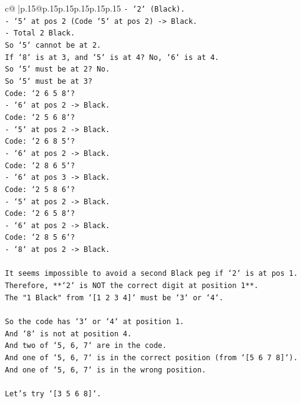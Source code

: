 \documentclass{article}
\begin{document}
{\begin{supertabular}{c@{$\;$}|p{.15\linewidth}@{}p{.15\linewidth}p{.15\linewidth}p{.15\linewidth}p{.15\linewidth}p{.15\linewidth}}
{{{\texttt{{-} `2` (Black).} \\
\texttt{{-} `5` at pos 2 (Code `5` at pos 2) {-}> Black.} \\
\texttt{{-} Total 2 Black.} \\
\texttt{So `5` cannot be at 2.} \\
\texttt{If `8` is at 3, and `5` is at 4? No, `6` is at 4.} \\
\texttt{So `5` must be at 2? No.} \\
\texttt{So `5` must be at 3?} \\
\texttt{Code: `2 6 5 8`?} \\
\texttt{{-} `6` at pos 2 {-}> Black.} \\
\texttt{Code: `2 5 6 8`?} \\
\texttt{{-} `5` at pos 2 {-}> Black.} \\
\texttt{Code: `2 6 8 5`?} \\
\texttt{{-} `6` at pos 2 {-}> Black.} \\
\texttt{Code: `2 8 6 5`?} \\
\texttt{{-} `6` at pos 3 {-}> Black.} \\
\texttt{Code: `2 5 8 6`?} \\
\texttt{{-} `5` at pos 2 {-}> Black.} \\
\texttt{Code: `2 6 5 8`?} \\
\texttt{{-} `6` at pos 2 {-}> Black.} \\
\texttt{Code: `2 8 5 6`?} \\
\texttt{{-} `8` at pos 2 {-}> Black.} \\
\\ 
\texttt{It seems impossible to avoid a second Black peg if `2` is at pos 1.} \\
\texttt{Therefore, **`2` is NOT the correct digit at position 1**.} \\
\texttt{The "1 Black" from `{[}1 2 3 4{]}` must be `3` or `4`.} \\
\\ 
\texttt{So the code has `3` or `4` at position 1.} \\
\texttt{And `8` is not at position 4.} \\
\texttt{And two of `5, 6, 7` are in the code.} \\
\texttt{And one of `5, 6, 7` is in the correct position (from `{[}5 6 7 8{]}`).} \\
\texttt{And one of `5, 6, 7` is in the wrong position.} \\
\\ 
\texttt{Let's try `{[}3 5 6 8{]}`.} \\
}}}
\end{supertabular}}
\end{document}
